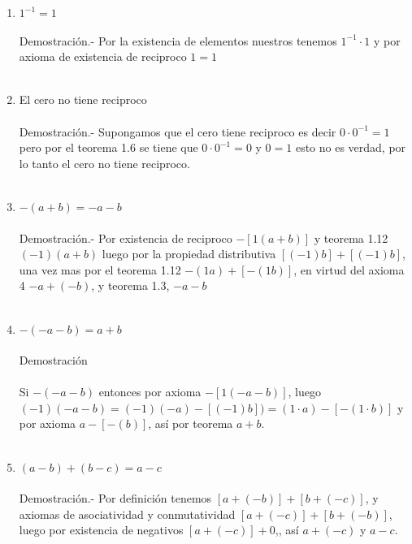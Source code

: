 \begin{enumerate}[\bfseries 1.]
\item 
$1^{-1}=1$\\\\
Demostración.- \;
Por la existencia de elementos nuestros tenemos $1^{-1}\cdot 1$ y por axioma de existencia de reciproco $1=1$\\\\

\item El cero no tiene reciproco\\\\
Demostración.- \;
Supongamos que el cero tiene reciproco es decir $0\cdot 0^{-1}=1$ pero por el teorema 1.6 se tiene que $0\cdot 0^{-1}=0$ y $0=1$ esto no es verdad, por lo tanto el cero no tiene reciproco.\\\\

\item $-(a+b)=-a-b$\\\\
Demostración.- \;
Por existencia de reciproco $-\left[1(a+b)\right]$ y teorema 1.12 $(-1)(a+b)$ luego por la propiedad distributiva $\left[ (-1)b \right] + \left[ (-1)b \right]$, una vez mas por el teorema 1.12 $-(1a)+ \left[-(1b)\right]$, en virtud del axioma 4 $-a+(-b)$, y teorema 1.3, $-a-b$ \\\\ 

\item $-(-a-b)=a+b$\\\\
Demostración\\\\
Si $-(-a-b)$ entonces por axioma $-\left[1(-a-b)\right]$, luego $(-1)(-a-b)=(-1)(-a)-\left[(-1)b\right])= (1\cdot a)-\left[-(1\cdot b)\right]$ y por axioma $a - \left[ - (b)\right]$, así por teorema $a+b$.\\\\

\item $(a-b)+(b-c)=a-c$\\\\
Demostración.- \;
Por definición tenemos $\left[ a+(-b) \right]+\left[ b+(-c) \right]$, y axiomas de asociatividad y conmutatividad $\left[ a+(-c) \right]+\left[ b+(-b) \right]$, luego por existencia de negativos  $\left[ a+(-c) \right] + 0$,, así $a+(-c)$ y $a-c$. \\\\


\end{enumerate}
